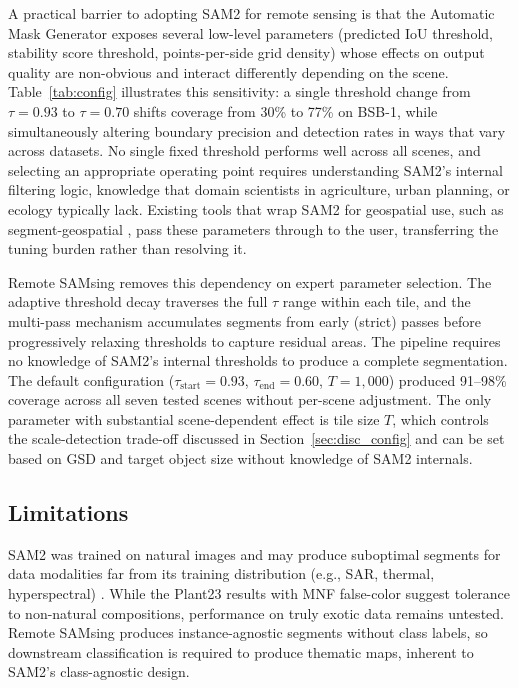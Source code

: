 \documentclass[review,11pt,authoryear]{elsarticle}
\begin{document}
A practical barrier to adopting SAM2 for remote sensing is that the Automatic Mask Generator exposes several low-level parameters (predicted IoU threshold, stability score threshold, points-per-side grid density) whose effects on output quality are non-obvious and interact differently depending on the scene. Table~\ref{tab:config} illustrates this sensitivity: a single threshold change from $\tau = 0.93$ to $\tau = 0.70$ shifts coverage from 30\% to 77\% on BSB-1, while simultaneously altering boundary precision and detection rates in ways that vary across datasets. No single fixed threshold performs well across all scenes, and selecting an appropriate operating point requires understanding SAM2's internal filtering logic, knowledge that domain scientists in agriculture, urban planning, or ecology typically lack. Existing tools that wrap SAM2 for geospatial use, such as segment-geospatial \citep{wu2023samgeo}, pass these parameters through to the user, transferring the tuning burden rather than resolving it.

Remote SAMsing removes this dependency on expert parameter selection. The adaptive threshold decay traverses the full $\tau$ range within each tile, and the multi-pass mechanism accumulates segments from early (strict) passes before progressively relaxing thresholds to capture residual areas. The pipeline requires no knowledge of SAM2's internal thresholds to produce a complete segmentation. The default configuration ($\tau_\text{start} = 0.93$, $\tau_\text{end} = 0.60$, $T = 1{,}000$) produced 91--98\% coverage across all seven tested scenes without per-scene adjustment. The only parameter with substantial scene-dependent effect is tile size $T$, which controls the scale-detection trade-off discussed in Section~\ref{sec:disc_config} and can be set based on GSD and target object size without knowledge of SAM2 internals.

\subsection{Limitations}
\label{sec:disc_limitations}

SAM2 was trained on natural images and may produce suboptimal segments for data modalities far from its training distribution (e.g., SAR, thermal, hyperspectral) \citep{zhang2025sam2survey}. While the Plant23 results with MNF false-color suggest tolerance to non-natural compositions, performance on truly exotic data remains untested. Remote SAMsing produces instance-agnostic segments without class labels, so downstream classification is required to produce thematic maps, inherent to SAM2's class-agnostic design.
\end{document}
